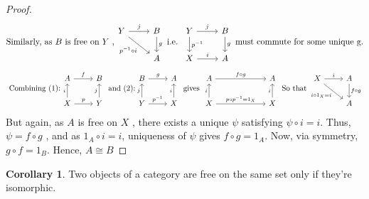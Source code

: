 \documentclass{article}
\theoremstyle{definition}
\theoremstyle{definition}
\newtheorem{corollary}{Corollary}[theorem]
\begin{document}
\begin{proof}
\begin{equation}
\text{Similarly, as $ B$  is free on $ Y $ ,}
\begin{tikzcd}
	Y \arrow{r}{j} \arrow[swap]{dr}{p^{-1} \circ i} & B  \arrow{d}{g} \\ & A
\end{tikzcd}
	\text{ i.e. }
	\begin{tikzcd}
		Y \arrow{r}{j} \arrow{d}{p^{-1}} & B  \arrow{d}{g} \\ X \arrow{r}{i} & A
	\end{tikzcd}
\text{ must commute for some unique g.}
\end{equation}
\begin{equation*}
	\text{ Combining (1):}
	\begin{tikzcd}
		A \arrow{r}{f} & B \\ X \arrow{u}{i} \arrow{r}{p} & Y\arrow{u}{j}
	\end{tikzcd}
	\text{ and (2):}
	\begin{tikzcd}
		B \arrow{r}{g} & A \\ Y \arrow{u}{j} \arrow{r}{p^{-1}} & X\arrow{u}{i}
	\end{tikzcd}
	\text{ gives }
	\begin{tikzcd}
		A \arrow{r}{f \circ g} &[4em] A \\ X \arrow{u}{i} \arrow{r}{p \circ p^{-1} = 1_X} & X\arrow{u}{i}
	\end{tikzcd}
	\text{ So that }
	\begin{tikzcd}
		X \arrow{r}{i} \arrow[swap]{dr}{i \circ 1_X = i} &A \arrow{d}{f \circ g} \\ &A
	\end{tikzcd}
\end{equation*}
But again, as $ A $ is free on $ X $ , there exists a unique $ \psi $ satisfying $ \psi \circ i = i $. Thus, $ \psi = f \circ g $ , and as $ 1_A \circ i = i $, uniqueness of $ \psi $ gives $ f \circ g = 1_A $. Now, via symmetry, $ g \circ f = 1_B $. Hence, $A \cong B$

\end{proof}
\begin{corollary}
	Two objects of a category are free on the same set only if they're isomorphic.
\end{corollary}
\end{document}
